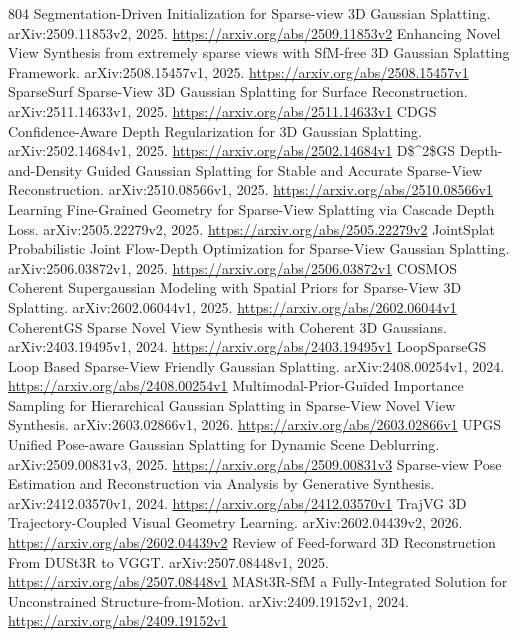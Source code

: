 \documentclass[11pt]{article}
\begin{document}
\begin{thebibliography}{804}
 Segmentation-Driven Initialization for Sparse-view 3D Gaussian Splatting. arXiv:2509.11853v2, 2025. \url{https://arxiv.org/abs/2509.11853v2}
 Enhancing Novel View Synthesis from extremely sparse views with SfM-free 3D Gaussian Splatting Framework. arXiv:2508.15457v1, 2025. \url{https://arxiv.org/abs/2508.15457v1}
 SparseSurf Sparse-View 3D Gaussian Splatting for Surface Reconstruction. arXiv:2511.14633v1, 2025. \url{https://arxiv.org/abs/2511.14633v1}
 CDGS Confidence-Aware Depth Regularization for 3D Gaussian Splatting. arXiv:2502.14684v1, 2025. \url{https://arxiv.org/abs/2502.14684v1}
 D\$\textasciicircum{}2\$GS Depth-and-Density Guided Gaussian Splatting for Stable and Accurate Sparse-View Reconstruction. arXiv:2510.08566v1, 2025. \url{https://arxiv.org/abs/2510.08566v1}
 Learning Fine-Grained Geometry for Sparse-View Splatting via Cascade Depth Loss. arXiv:2505.22279v2, 2025. \url{https://arxiv.org/abs/2505.22279v2}
 JointSplat Probabilistic Joint Flow-Depth Optimization for Sparse-View Gaussian Splatting. arXiv:2506.03872v1, 2025. \url{https://arxiv.org/abs/2506.03872v1}
 COSMOS Coherent Supergaussian Modeling with Spatial Priors for Sparse-View 3D Splatting. arXiv:2602.06044v1, 2025. \url{https://arxiv.org/abs/2602.06044v1}
 CoherentGS Sparse Novel View Synthesis with Coherent 3D Gaussians. arXiv:2403.19495v1, 2024. \url{https://arxiv.org/abs/2403.19495v1}
 LoopSparseGS Loop Based Sparse-View Friendly Gaussian Splatting. arXiv:2408.00254v1, 2024. \url{https://arxiv.org/abs/2408.00254v1}
 Multimodal-Prior-Guided Importance Sampling for Hierarchical Gaussian Splatting in Sparse-View Novel View Synthesis. arXiv:2603.02866v1, 2026. \url{https://arxiv.org/abs/2603.02866v1}
 UPGS Unified Pose-aware Gaussian Splatting for Dynamic Scene Deblurring. arXiv:2509.00831v3, 2025. \url{https://arxiv.org/abs/2509.00831v3}
 Sparse-view Pose Estimation and Reconstruction via Analysis by Generative Synthesis. arXiv:2412.03570v1, 2024. \url{https://arxiv.org/abs/2412.03570v1}
 TrajVG 3D Trajectory-Coupled Visual Geometry Learning. arXiv:2602.04439v2, 2026. \url{https://arxiv.org/abs/2602.04439v2}
 Review of Feed-forward 3D Reconstruction From DUSt3R to VGGT. arXiv:2507.08448v1, 2025. \url{https://arxiv.org/abs/2507.08448v1}
 MASt3R-SfM a Fully-Integrated Solution for Unconstrained Structure-from-Motion. arXiv:2409.19152v1, 2024. \url{https://arxiv.org/abs/2409.19152v1}

\end{thebibliography}
\end{document}
